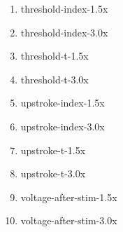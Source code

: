 \begin{enumerate}
\item threshold-index-1.5x
\item threshold-index-3.0x
\item threshold-t-1.5x
\item threshold-t-3.0x
\item upstroke-index-1.5x
\item upstroke-index-3.0x
\item upstroke-t-1.5x
\item upstroke-t-3.0x
\item voltage-after-stim-1.5x
\item voltage-after-stim-3.0x
\end{enumerate}

\begin{comment}

\subsection{Many More Results}

Each row in the table above, is dependant on a range of different final optimiser scores. 
\begin{table}[ht]
\centering
\resizebox{\textwidth}{!}{
\begin{tabular}{lllll}
\toprule{} &   observations &    predictions & Z-Scores \\
\midrule
RheobaseTest         &       190.0 pA &       168.1 pA &      0.1 \\
TimeConstantTest     &        13.8 ms &        8.12 ms &      0.2 \\
RestingPotentialTest &       -77.5 mV &      -73.82 mV &     0.02 \\
InputResistanceTest  &  132.0 megaohm &  44.91 megaohm &     0.45 \\
FITest               &     0.18 Hz/pA &   0.18 Hz/pA &        0 \\

\bottomrule
\end{tabular}}
\caption[Observation, Prediction, Z-score]{Here we see: observation, prediction and Z-score on a model, by test basis. In otherwords if you break down each of the $\chi^{2}$ values in the table above, you can track down each value to these kinds of Z-score calculations}
\end{table} 





\end{comment}
